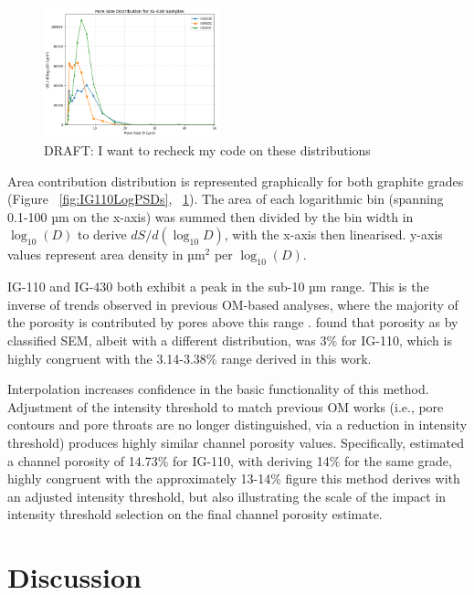 \documentclass[review]{elsarticle}
\begin{document}
\begin{figure}
    \centering
    \includegraphics[width=0.45\textwidth]{./Media/IG430 ds LogD .png}
    \caption{DRAFT: I want to recheck my code on these distributions}
    \label{fig:IG430LogPSDs}
\end{figure}

Area contribution distribution is represented graphically for both graphite
grades (Figure ~\ref{fig:IG110LogPSDs}, ~\ref{fig:IG430LogPSDs}). The area of
each logarithmic bin (spanning 0.1-100 µm on the x-axis) was summed then divided
by the bin width in \(\log_{10}(D)\) to derive \(dS/d(\log_{10}D)\), with the
x-axis then linearised.  y-axis values represent area density in µm\(^2\) per
\(\log_{10}(D)\).

IG-110 and IG-430 both exhibit a peak in the sub-10 µm range. This is the
inverse of trends observed in previous OM-based analyses, where the majority of
the porosity is contributed by pores above this range \citep{Huang2019}.
\citep{huang2021statistical} found that porosity as by classified SEM, albeit 
with a different distribution, was 3\% for IG-110, which is highly
congruent with the 3.14-3.38\% range derived in this work.

Interpolation increases confidence in the basic functionality of this method.
Adjustment of the intensity threshold to match previous OM works (i.e., pore
contours and pore throats are no longer distinguished, via a reduction in
intensity threshold) produces highly similar channel porosity values.
Specifically, \citep{Kane2011a} estimated a channel porosity of 14.73\% for
IG-110, with \citep{Huang2019} deriving 14\% for the same grade, highly
congruent with the approximately 13-14\% figure this method derives with an
adjusted intensity threshold, but also illustrating the scale of the impact in
intensity threshold selection on the final channel porosity estimate.

\section{Discussion}
\end{document}
